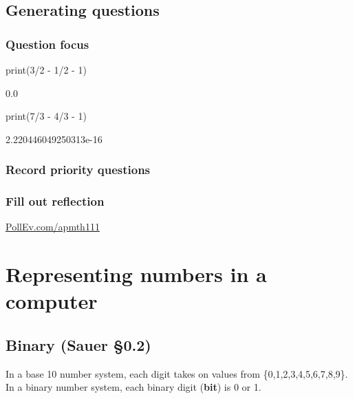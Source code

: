 \documentclass[12pt,letterpaper,noanswers]{exam}
\begin{document}
\subsection{Generating questions}
\subsubsection{Question focus}
\begin{pyin}
print(3/2 - 1/2 - 1)
\end{pyin}

\begin{pyprint}
0.0
\end{pyprint}

\begin{pyin}
print(7/3 - 4/3 - 1)
\end{pyin}

\begin{pyprint}
2.220446049250313e-16
\end{pyprint}

\subsubsection{Record priority questions}
\vspace{1in}

\subsubsection{Fill out reflection}
\url{PollEv.com/apmth111}

\section{Representing numbers in a computer}
\subsection{Binary (Sauer \S 0.2)}

In a base 10 number system, each digit takes on values from \{0,1,2,3,4,5,6,7,8,9\}.  In a binary number system, each binary digit (\textbf{bit}) is 0 or 1.

\vspace{0.5in}
\end{document}
